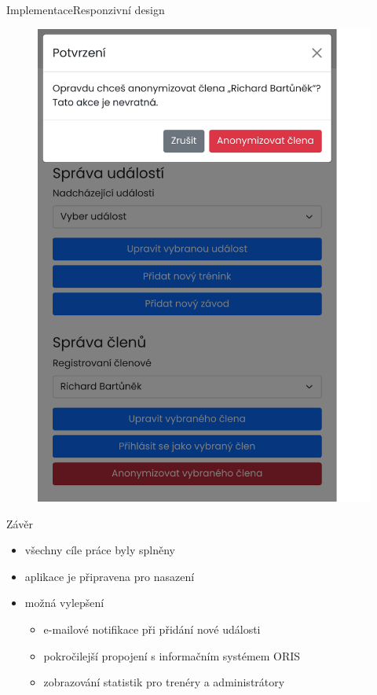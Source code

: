 \documentclass[aspectratio=169]{beamer}
\begin{document}
\begin{frame}{Implementace}{Responzivní design}
\begin{figure}[h]
\begin{minipage}[b]{0.3\linewidth}
            \includegraphics[width=0.9\linewidth, cfbox=confirm-gray 0.5pt 0pt]{images/confirm-dialog.pdf}
        \end{minipage}
        \hfill
    \end{figure}
\end{frame}

\begin{frame}{Závěr}
    \begin{itemize}
        \item všechny cíle práce byly splněny
        \item aplikace je připravena pro nasazení
        \item možná vylepšení
        \begin{itemize}
            \item e-mailové notifikace při přidání nové události
            \item pokročilejší propojení s informačním systémem ORIS
            \item zobrazování statistik pro trenéry a administrátory
        \end{itemize}
    \end{itemize}
\end{frame}
\end{document}
